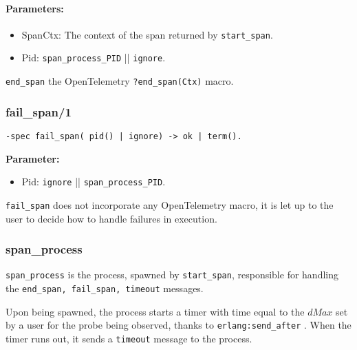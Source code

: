             \paragraph{Parameters:}
            \begin{itemize}
                \item SpanCtx: The context of the span returned by \texttt{start\_span}.
                \item Pid: \texttt{span\_process\_PID} || \texttt{ignore}.
            \end{itemize}

   \texttt{end\_span} the OpenTelemetry \texttt{?end\_span(Ctx)} macro. 
        \subsubsection{fail\_span/1}
        \begin{verbatim}        
-spec fail_span( pid() | ignore) -> ok | term().
        \end{verbatim}

        \textbf{Parameter:}
             \begin{itemize}
                \item Pid: \texttt{ignore} || \texttt{span\_process\_PID}.
            \end{itemize}
            \texttt{fail\_span} does not incorporate any OpenTelemetry macro, it is let up to the user to decide how to handle failures in execution.
        \subsubsection{span\_process}
            \texttt{span\_process} is the process, spawned by \texttt{start\_span}, responsible for handling the \texttt{end\_span, fail\_span, timeout} messages.

            Upon being spawned, the process starts a timer with time equal to the $dMax$ set by a user for the probe being observed, thanks to \texttt{erlang:send\_after} \cite{send-af}. When the timer runs out, it sends a \texttt{timeout} message to the process.
        
